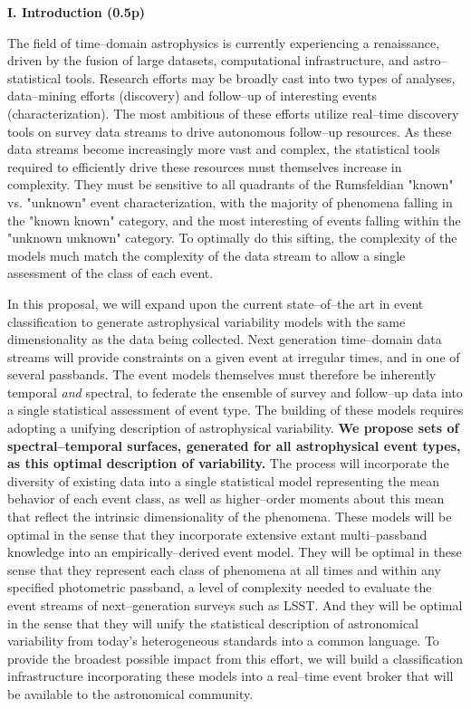\centerline{\bf I. Introduction (0.5p)} \smallskip

The field of time--domain astrophysics is currently experiencing a renaissance,
driven by the fusion of large datasets, computational infrastructure, and
astro--statistical tools.  Research efforts may be broadly cast into two types
of analyses, data--mining efforts (discovery) and follow--up of interesting
events (characterization).  The most ambitious of these efforts utilize
real--time discovery tools on survey data streams to drive autonomous follow--up
resources. As these data streams become increasingly more vast and complex, the
statistical tools required to efficiently drive these resources must themselves
increase in complexity.  They must be sensitive to all quadrants of the
Rumsfeldian "known" vs. "unknown" event characterization, with the majority of
phenomena falling in the "known known" category, and the most interesting of
events falling within the "unknown unknown" category.  To optimally do this
sifting, the complexity of the models much match the complexity of the data
stream to allow a single assessment of the class of each event.

In this proposal, we will expand upon the current state--of--the art in event
classification to generate astrophysical variability models with the same
dimensionality as the data being collected. Next generation time--domain data
streams will provide constraints on a given event at irregular times, and in one
of several passbands.  The event models themselves must therefore be inherently
temporal {\it and} spectral, to federate the ensemble of survey and follow--up
data into a single statistical assessment of event type.  The building of these
models requires adopting a unifying description of astrophysical variability.
{\bf We propose sets of spectral--temporal surfaces, generated for all
astrophysical event types, as this optimal description of variability.}  The
process will incorporate the diversity of existing data into a single
statistical model representing the mean behavior of each event class, as well as
higher--order moments about this mean that reflect the intrinsic dimensionality
of the phenomena.  These models will be optimal in the sense that they
incorporate extensive extant multi--passband knowledge into an
empirically--derived event model.  They will be optimal in these sense that they
represent each class of phenomena at all times and within any specified
photometric passband, a level of complexity needed to evaluate the event streams
of next--generation surveys such as LSST. And they will be optimal in the sense
that they will unify the statistical description of astronomical variability
from today's heterogeneous standards into a common language.  To provide the
broadest possible impact from this effort, we will build a classification
infrastructure incorporating these models into a real--time event broker that
will be available to the astronomical community.



